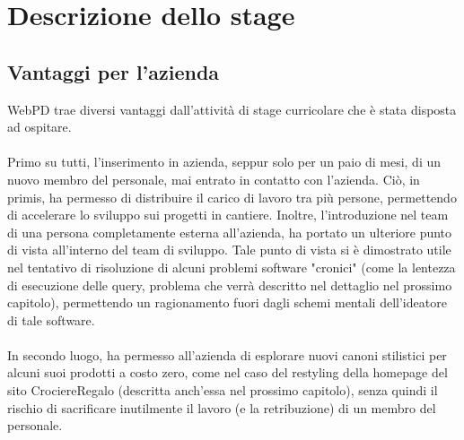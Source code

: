 
\chapter{Descrizione dello stage}
\label{cap:descrizione-stage}

\section{Vantaggi per l'azienda}
WebPD trae diversi vantaggi dall'attività di stage curricolare che è stata disposta ad ospitare.\\
\\
Primo su tutti, l'inserimento in azienda, seppur solo per un paio di mesi, di un nuovo membro del personale, mai entrato in contatto con l'azienda. Ciò, in primis, ha permesso di distribuire il carico di lavoro tra più persone, permettendo di accelerare lo sviluppo sui progetti in cantiere. Inoltre, l'introduzione nel team di una persona completamente esterna all'azienda, ha portato un ulteriore punto di vista all'interno del team di sviluppo. Tale punto di vista si è dimostrato utile nel tentativo di risoluzione di alcuni problemi software "cronici" (come la lentezza di esecuzione delle query, problema che verrà descritto nel dettaglio nel prossimo capitolo), permettendo un ragionamento fuori dagli schemi mentali dell'ideatore di tale software.\\
\\
In secondo luogo, ha permesso all'azienda di esplorare nuovi canoni stilistici per alcuni suoi prodotti a costo zero, come nel caso del restyling della homepage del sito CrociereRegalo (descritta anch'essa nel prossimo capitolo), senza quindi il rischio di sacrificare inutilmente il lavoro (e la retribuzione) di un membro del personale.

